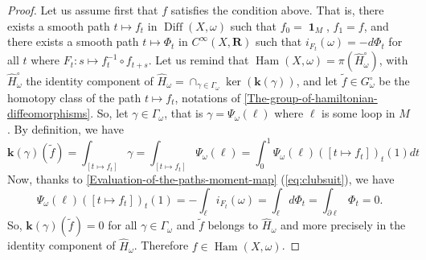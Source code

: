 \documentclass[10pt,reqno,twoside]{amsart}
\newcommand{\RR}{\mathbf{R}}
\DeclareMathOperator{\id}{\mathbf{1}}
\DeclareMathOperator{\Diff}{Diff}
\DeclareMathOperator{\Ham}{Ham}
\newcommand{\Cinfty}{C^\infty}
\newcommand{\ek}{\mathbf{k}}
\theoremstyle{plain}
\theoremstyle{definition}
\begin{document}
  \begin{proof}
    Let us assume first that $f$ satisfies the condition above.
    That is,
    there exists a smooth path $t \mapsto f_t$ in $\Diff(X,\omega)$ such that $f_0 = \id_M$,
    $f_1 = f$,
    and there exists a smooth path $t \mapsto \Phi_t$ in $\Cinfty(X,\RR)$ such that $i_{F_t}(\omega) = - d\Phi_t$ for all $t$ where $F_t : s \mapsto f_t^{-1} \circ f_{t+s}$.
    Let us remind that $\Ham(X, \omega) = \pi(\widehat H_\omega^\circ)$,
    with $\widehat H_\omega^\circ$ the identity component of $\widehat H_\omega = \cap_{\gamma \in \Gamma_\omega} \ker(\ek(\gamma))$,
    and let $\tilde f \in G_\omega^\circ$ be the homotopy class of the path $t \mapsto f_t$,
    notations of \ref{The-group-of-hamiltonian-diffeomorphisms}.
    So,
    let $\gamma \in \Gamma_\omega$,
    that is $\gamma = \Psi_\omega(\ell)$ where $\ell$ is some loop in $M$.
    By definition,
    we have
    $$
      \ek(\gamma)(\tilde f) = \int_{[t \mapsto f_t]} \gamma
      = \int_{[t \mapsto f_t]} \Psi_\omega(\ell) = \int_0^1
      \Psi_\omega(\ell)([t \mapsto f_t])_t(1) dt
      $$
    Now,
    thanks to \ref{Evaluation-of-the-paths-moment-map} (\ref{eq:clubsuit}),
    we have
    $$
      \Psi_\omega(\ell)([t \mapsto f_t])_t(1) = - \int_\ell i_{F_t}(\omega) = \int_\ell d\Phi_t = \int_{\partial \ell} \Phi_t = 0.
      $$
    So,
    $\ek(\gamma)(\tilde f) = 0$ for all $\gamma \in \Gamma_\omega$ and $\tilde f$ belongs to $\widehat H_\omega$ and more precisely in the identity component of $\widehat H_\omega$.
    Therefore $f \in \Ham(X,\omega)$.
    

\end{proof}
\end{document}
